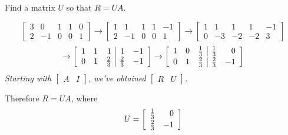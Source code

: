 \documentclass[pdf
,handout
]{beamer}
\begin{document}
{{{\begin{problem}
Find a matrix $U$ so that $R=UA$.
\end{problem}
\pause
\begin{solution}\em
{\small
\[ 
\left[\begin{array}{rrr|rr}
3 & 0 & 1 & 1 & 0 \\
2 & -1 & 0 & 0 & 1
\end{array}\right]
\rightarrow
\left[\begin{array}{rrr|rr}
1 & 1 & 1 & 1 & -1 \\
2 & -1 & 0 & 0 & 1
\end{array}\right]
\rightarrow
\left[\begin{array}{rrr|rr}
1 & 1 & 1 & 1 & -1 \\
0 & -3 & -2 & -2 & 3
\end{array}\right]
\]
\[ 
\rightarrow
\left[\begin{array}{rrr|rr}
1 & 1 & 1 & 1 & -1 \\
0 & 1 & \frac{2}{3} & \frac{2}{3} & -1
\end{array}\right]
\rightarrow
\left[\begin{array}{rrr|rr}\vspace*{.02in}
1 & 0 & \frac{1}{3} & \frac{1}{3} & 0 \\
0 & 1 & \frac{2}{3} & \frac{2}{3} & -1
\end{array}\right]
\]}
\pause
Starting with 
$\left[\begin{array}{c|c}
A & I \end{array}\right]$, we've obtained
$\left[\begin{array}{c|c}
R & U \end{array}\right]$.

\pause
Therefore $R=UA$, where
\[ U=\left[\begin{array}{rr}\vspace*{.02in}
\frac{1}{3} & 0 \\
\frac{2}{3} & -1
\end{array}\right] \]
\end{solution}
}

}}
\end{document}
